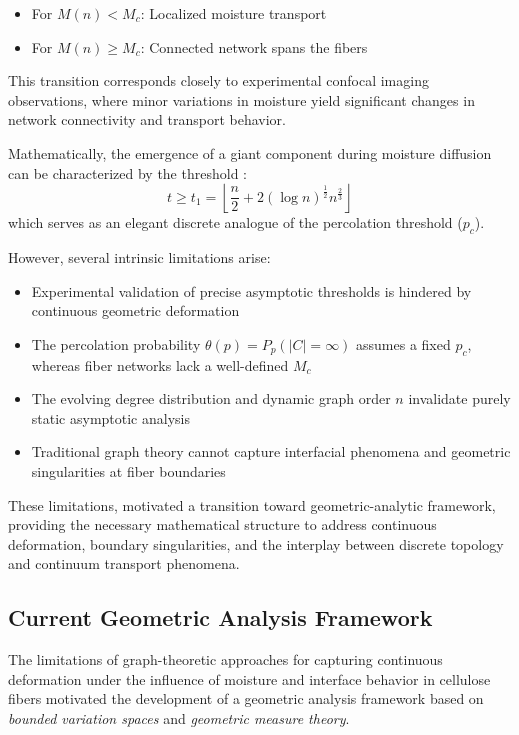\documentclass[11pt]{article}
\begin{document}
\begin{itemize}
    \item For $M(n)<M_c$: Localized moisture transport 
    \item For $M(n)\geq M_c$: Connected network spans the fibers
\end{itemize}
This transition corresponds closely to experimental confocal imaging observations, where minor variations in moisture yield significant changes in network connectivity and transport behavior.

Mathematically, the emergence of a giant component during moisture diffusion can be characterized by the threshold \cite[Theorem 6.8]{bollobas2011random}:
\begin{equation*}
     t\geq t_1 = \left\lfloor \frac{n}{2} + 2(\log n)^{\frac{1}{2}}n^{\frac{2}{3}}\right\rfloor
\end{equation*}
which serves as an elegant discrete analogue of the percolation threshold ($p_c$). 

However, several intrinsic limitations arise:
\begin{itemize}
    \item Experimental validation of precise asymptotic thresholds is hindered by continuous geometric deformation
    \item The percolation probability $\theta(p)=P_p(|C|=\infty)$ \cite{grimmett2012percolation} assumes a fixed $p_c$, whereas fiber networks lack a well-defined $M_c$
    \item The evolving degree distribution and dynamic graph order $n$ invalidate purely static asymptotic analysis
    \item Traditional graph theory cannot capture interfacial phenomena and geometric singularities at fiber boundaries
\end{itemize}

These limitations, motivated a transition toward geometric-analytic framework, providing the necessary mathematical structure to address continuous deformation, boundary singularities, and the interplay between discrete
topology and continuum transport phenomena.

\subsection{Current Geometric Analysis Framework}
The limitations of graph-theoretic approaches for capturing continuous deformation under the influence of moisture and interface behavior in cellulose fibers motivated the development of a geometric analysis framework based on \textit{bounded variation spaces} and \textit{geometric measure theory}. 
\end{document}
